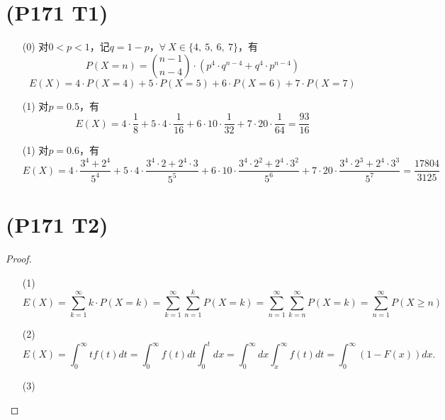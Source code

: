 \documentclass{article}
\begin{document}
\section{(P171 T1)}  %
\begin{enumerate}
    \item [(0)]对$0<p<1$，记$q=1-p$，$\forall\ X\in \{4,\ 5,\ 6,\ 7 \}$，有
    \[
        P(X=n) = \binom{n-1}{n-4} \cdot (p^4 \cdot q^{n-4} + q^4 \cdot p^{n-4})   
    \]
    \[
        E(X) = 4\cdot P(X=4) + 5 \cdot P(X=5) + 6\cdot P(X=6) + 7\cdot P(X=7)
    \]
    \item [(1)]对$p=0.5$，有
    \[
        E(X) = 4 \cdot \frac{1}{8} + 5 \cdot 4 \cdot \frac{1}{16} + 
        6 \cdot 10 \cdot \frac{1}{32} + 7 \cdot 20 \cdot \frac{1}{64}
        = \frac{93}{16}
    \]
    \item [(1)]对$p=0.6$，有
    \[
        E(X) 
        = 
        4 \cdot \frac{3^4 + 2^4}{5^4}
        + 5 \cdot 4 \cdot \frac{3^4\cdot 2 + 2^4 \cdot 3}{5^5}
        + 6 \cdot 10 \cdot \frac{3^4\cdot 2^2 + 2^4 \cdot 3^2}{5^6} 
        + 7 \cdot 20 \cdot \frac{3^4\cdot 2^3 + 2^4 \cdot 3^3}{5^7}
        = \frac{17804}{3125}
    \]
\end{enumerate}


\section{(P171 T2)}  %
\begin{proof}
    \begin{enumerate}
        \item []
        \item [(1)]
        \[
            E(X) 
            = \sum\limits_{k=1}^{\infty} k \cdot P(X=k)    
            = \sum\limits_{k=1}^{\infty} \sum\limits_{n=1}^{k} P(X=k)
            = \sum\limits_{n=1}^{\infty} \sum\limits_{k=n}^{\infty} P(X=k)
            = \sum\limits_{n=1}^{\infty} P(X\geq n)
        \]
        \item [(2)]
        \[
            E(X)
            = \int_{0}^{\infty} t f(t) dt 
            = \int_{0}^{\infty} f(t) dt \int_{0}^{t} dx
            = \int_{0}^{\infty} dx \int_{x}^{\infty} f(t) dt
            = \int_{0}^{\infty} (1- F(x)) dx.
         \]
        \item [(3)]
    \end{enumerate}
\end{proof}
\end{document}
